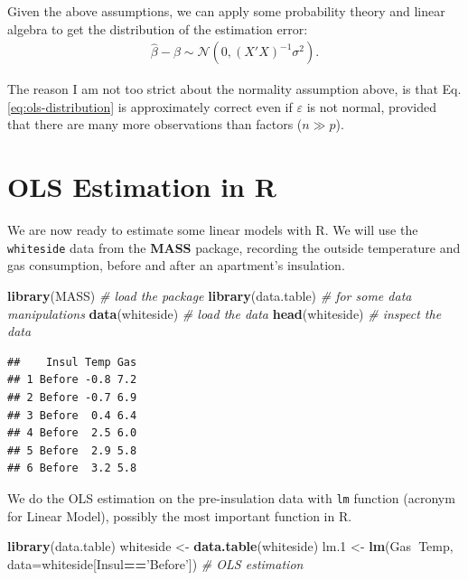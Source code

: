 \documentclass[]{book}
\newenvironment{Shaded}{\begin{snugshade}}{\end{snugshade}}
\newcommand{\CommentTok}[1]{\textcolor[rgb]{0.56,0.35,0.01}{\textit{#1}}}
\newcommand{\DataTypeTok}[1]{\textcolor[rgb]{0.13,0.29,0.53}{#1}}
\newcommand{\FloatTok}[1]{\textcolor[rgb]{0.00,0.00,0.81}{#1}}
\newcommand{\KeywordTok}[1]{\textcolor[rgb]{0.13,0.29,0.53}{\textbf{#1}}}
\newcommand{\NormalTok}[1]{#1}
\newcommand{\OperatorTok}[1]{\textcolor[rgb]{0.81,0.36,0.00}{\textbf{#1}}}
\newcommand{\StringTok}[1]{\textcolor[rgb]{0.31,0.60,0.02}{#1}}
\theoremstyle{definition}
\theoremstyle{definition}
\theoremstyle{definition}
\theoremstyle{remark}
\begin{document}
Given the above assumptions, we can apply some probability theory and linear algebra to get the distribution of the estimation error:
\begin{align}
  \hat \beta - \beta \sim \mathcal{N}(0, (X'X)^{-1} \sigma^2).
  \label{eq:ols-distribution}
\end{align}

The reason I am not too strict about the normality assumption above, is that Eq.\eqref{eq:ols-distribution} is approximately correct even if \(\varepsilon\) is not normal, provided that there are many more observations than factors (\(n \gg p\)).

\hypertarget{ols-estimation-in-r}{%
\section{OLS Estimation in R}\label{ols-estimation-in-r}}

We are now ready to estimate some linear models with R.
We will use the \texttt{whiteside} data from the \textbf{MASS} package, recording the outside temperature and gas consumption, before and after an apartment's insulation.

\begin{Shaded}
\begin{Highlighting}[]
\KeywordTok{library}\NormalTok{(MASS) }\CommentTok{# load the package}
\KeywordTok{library}\NormalTok{(data.table) }\CommentTok{# for some data manipulations}
\KeywordTok{data}\NormalTok{(whiteside) }\CommentTok{# load the data}
\KeywordTok{head}\NormalTok{(whiteside) }\CommentTok{# inspect the data}
\end{Highlighting}
\end{Shaded}

\begin{verbatim}
##    Insul Temp Gas
## 1 Before -0.8 7.2
## 2 Before -0.7 6.9
## 3 Before  0.4 6.4
## 4 Before  2.5 6.0
## 5 Before  2.9 5.8
## 6 Before  3.2 5.8
\end{verbatim}

We do the OLS estimation on the pre-insulation data with \texttt{lm} function (acronym for Linear Model), possibly the most important function in R.

\begin{Shaded}
\begin{Highlighting}[]
\KeywordTok{library}\NormalTok{(data.table)}
\NormalTok{whiteside <-}\StringTok{ }\KeywordTok{data.table}\NormalTok{(whiteside)}
\NormalTok{lm}\FloatTok{.1}\NormalTok{ <-}\StringTok{ }\KeywordTok{lm}\NormalTok{(Gas}\OperatorTok{~}\NormalTok{Temp, }\DataTypeTok{data=}\NormalTok{whiteside[Insul}\OperatorTok{==}\StringTok{'Before'}\NormalTok{]) }\CommentTok{# OLS estimation }
\end{Highlighting}
\end{Shaded}
\end{document}
